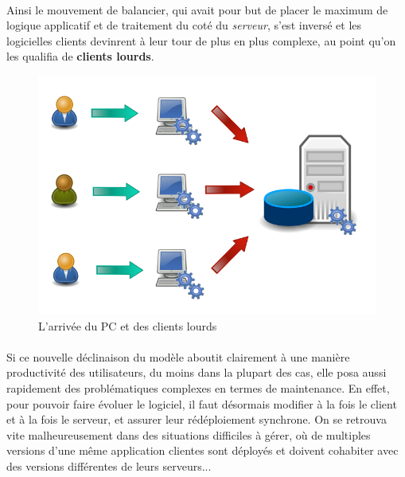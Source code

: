 {  \paragraph{} Ainsi le mouvement de balancier, qui avait pour but de placer le maximum de logique
  applicatif et de traitement du coté du \textit{serveur}, s'est inversé et les logicielles clients
  devinrent à leur tour de plus en plus complexe, au point qu'on les qualifia de \textbf{clients
  lourds}.

  \begin{figure}[h]
    \begin{center}
      \includegraphics[scale=0.3]{img/fat-clients.png}
      \caption{L'arrivée du PC et des clients lourds}
      \label{fat-clients}
    \end{center}
  \end{figure}


  \paragraph{} Si ce nouvelle déclinaison du modèle aboutit clairement à une manière productivité
  des utilisateurs, du moins dans la plupart des cas, elle posa aussi rapidement des problématiques
  complexes en termes de maintenance. En effet, pour pouvoir faire évoluer le logiciel, il faut
  désormais modifier à la fois le client et à la fois le serveur, et assurer leur rédéploiement
  synchrone. On se retrouva vite malheureusement dans des situations difficiles à gérer, où de
  multiples versions d'une même application clientes sont déployés et doivent cohabiter avec des
  versions différentes de leurs serveurs...
}

